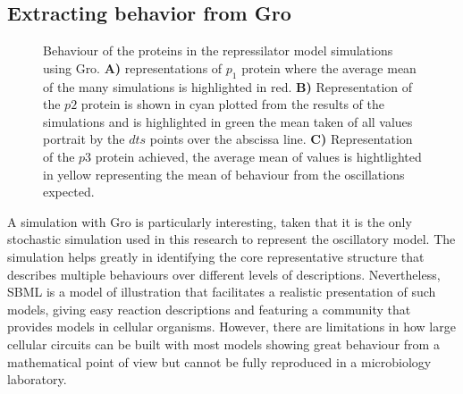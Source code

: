 \documentclass[12pt]{article}
\begin{document}
\subsection{Extracting behavior from Gro}

\begin{center}
    \begin{figure}[h]
        
        
        
    
        Behaviour of the proteins in the repressilator model simulations using Gro. \textbf{A)} representations of $p_{1}$ protein where the average mean of the many simulations is highlighted in red. \textbf{B)} Representation of the $p2$ protein is shown in cyan plotted from the results of the simulations and is highlighted in green the mean taken of all values portrait by the $dts$ points over the abscissa line. \textbf{C)} Representation of the $p3$ protein achieved, the average mean of values is hightlighted in yellow representing the mean of behaviour from the oscillations expected.
    \end{figure}
\end{center}

A simulation with Gro is particularly interesting, taken that it is the only stochastic simulation used in this research to represent the oscillatory model. The simulation helps greatly in identifying the core representative structure that describes multiple behaviours over different levels of descriptions. Nevertheless, SBML is a model of illustration that facilitates a realistic presentation of such models, giving easy reaction descriptions and featuring a community that provides models in cellular organisms. However, there are limitations in how large cellular circuits can be built with most models showing great behaviour from a mathematical point of view but cannot be fully reproduced in a microbiology laboratory.
\end{document}
